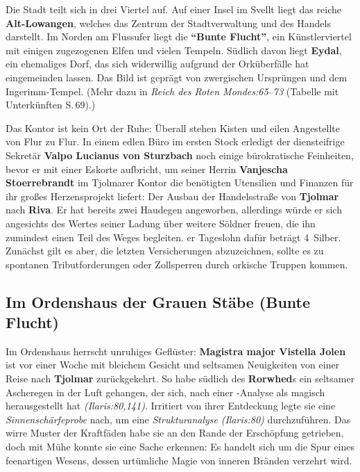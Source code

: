 Die Stadt teilt sich in drei Viertel auf. Auf einer Insel im Svellt liegt das reiche \textbf{Alt-Lowangen}, welches das Zentrum der Stadtverwaltung und des Handels darstellt. Im Norden am Flussufer liegt die \textbf{\enquote{Bunte Flucht}}, ein Künstlerviertel mit einigen zugezogenen Elfen und vielen Tempeln.
Südlich davon liegt \textbf{Eydal}, ein ehemaliges Dorf, das sich widerwillig aufgrund der Orküberfälle hat eingemeinden lassen.
Das Bild ist geprägt von zwergischen Ursprüngen und dem Ingerimm-Tempel.
(Mehr dazu in \emph{Reich des Roten Mondes:65--73} (Tabelle mit Unterkünften S.\,69).)


Das Kontor ist kein Ort der Ruhe:
Überall stehen Kisten und eilen Angestellte von Flur zu Flur. In einem edlen Büro im ersten Stock erledigt der diensteifrige Sekretär \textbf{Valpo Lucianus von Sturzbach} noch einige bürokratische Feinheiten, bevor er mit einer Eskorte aufbricht,
	um seiner Herrin \textbf{Vanjescha Stoerrebrandt} im Tjolmarer Kontor die benötigten Utensilien und Finanzen für ihr großes Herzensprojekt liefert:
	Der Ausbau der Handelsstraße von \textbf{Tjolmar} nach \textbf{Riva}.
	Er hat bereits zwei Haudegen angeworben, allerdings würde er sich angesichts des Wertes seiner Ladung über weitere Söldner freuen, die ihn zumindest einen Teil des Weges begleiten. 
	er Tageslohn dafür beträgt 4~Silber. Zunächst gilt es aber, die letzten Versicherungen abzuzeichnen, sollte es zu spontanen Tributforderungen oder Zollsperren durch orkische Truppen kommen.


\subsection[Im Ordenshaus der Grauen Stäbe]{Im Ordenshaus der Grauen Stäbe (Bunte Flucht)}
Im Ordenshaus herrscht unruhiges Geflüster: \textbf{Magistra major Vistella Jolen} ist vor einer Woche mit bleichem Gesicht und seltsamen Neuigkeiten von einer Reise nach \textbf{Tjolmar} zurückgekehrt. So habe südlich des \textbf{Rorwhed}s ein seltsamer Ascheregen in der Luft gehangen, der sich, nach einer -Analyse als magisch herausgestellt hat \emph{(Ilaris:80,141)}.
Irritiert von ihrer Entdeckung legte sie eine \emph{Sinnenschärfeprobe} nach, um eine \emph{Strukturanalyse} \emph{(Ilaris:80)} durchzuführen. Das wirre Muster der Kraftfäden habe sie an den Rande der Erschöpfung getrieben, doch mit Mühe konnte sie eine Sache erkennen: Es handelt sich um die Spur eines feenartigen Wesens, dessen urtümliche Magie von inneren Bränden verzehrt wird.

